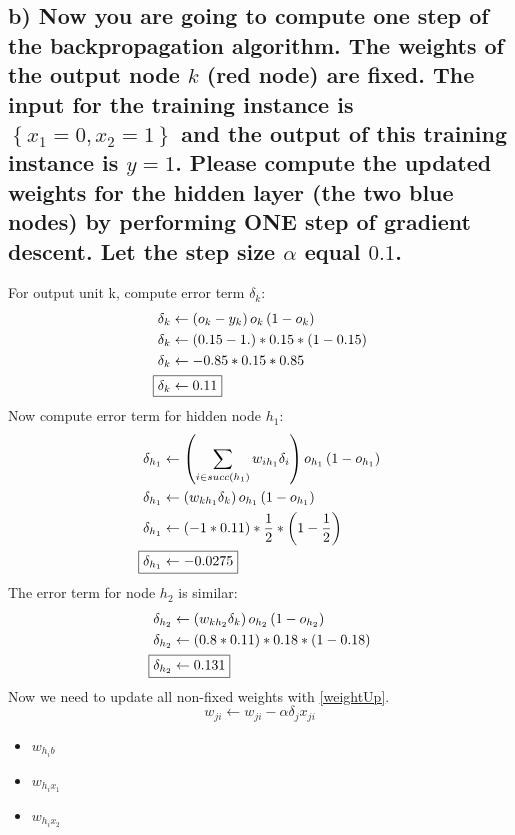 \documentclass[12pt,letterpaper]{article}
\begin{document}
\subsection{b) Now you are going to compute one step of the backpropagation algorithm. The weights of the output node $k$ (red node) are fixed. The input for the training instance is $\left\lbrace x_1=0,x_2=1\right\rbrace$ and the output of this training instance is $y=1$. Please compute the updated weights for the hidden layer (the two blue nodes) by performing ONE step of gradient descent. Let the step size $\alpha$ equal $0.1$.}
For output unit k, compute error term $\delta_k$:
\begin{align*}
\delta_k &\leftarrow \left(o_k-y_k\right)o_k\left(1-o_k\right)\\
\delta_k &\leftarrow \left(0.15-1.\right) * 0.15 * \left(1-0.15\right)\\
\delta_k &\leftarrow -0.85 * 0.15 * 0.85\\
\Aboxed{\delta_k &\leftarrow 0.11}
\end{align*}
Now compute error term for hidden node $h_1$:
\begin{align*}
\delta_{h_1} &\leftarrow \left(\sum_{i\in succ(h_1)}{w_{ih_1}\delta_i}\right)o_{h_1}\left(1-o_{h_1}\right)\\
\delta_{h_1} &\leftarrow \left(w_{kh_1}\delta_k\right)o_{h_1}\left(1-o_{h_1}\right)\\
\delta_{h_1} &\leftarrow \left(-1*0.11\right)*\frac{1}{2}*\left(1-\frac{1}{2}\right)\\
\Aboxed{\delta_{h_1} &\leftarrow -0.0275}
\end{align*}
The error term for node $h_2$ is similar:
\begin{align*}
\delta_{h_2} &\leftarrow \left(w_{kh_2}\delta_k\right)o_{h_2}\left(1-o_{h_2}\right)\\
\delta_{h_2} &\leftarrow \left(0.8*0.11\right)*0.18*\left(1-0.18\right)\\
\Aboxed{\delta_{h_2} &\leftarrow 0.131}
\end{align*}
Now we need to update all non-fixed weights with \eqref{weightUp}.
\begin{equation}
\label{weightUp}
w_{ji} \leftarrow w_{ji}-\alpha\delta_jx_{ji}
\end{equation}
\begin{itemize}
\item $w_{h_ib}$
\item $w_{h_i x_1}$
\item $w_{h_i x_2}$
\end{itemize}
\end{document}
